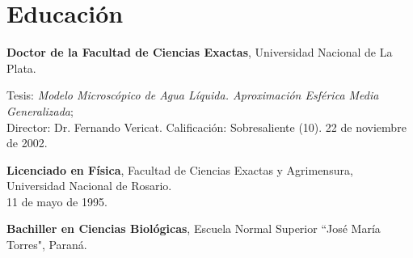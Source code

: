 \section*{Educación}

 \textbf{Doctor de la Facultad de Ciencias Exactas}, Universidad Nacional de La Plata.

Tesis: \emph{Modelo Microscópico de Agua Líquida. Aproximación Esférica Media Generalizada}; \\Director: Dr. Fernando Vericat. Calificación: Sobresaliente  (10). 22 de noviembre de 2002.

 \textbf{Licenciado en Física}, Facultad de Ciencias Exactas y Agrimensura, Universidad Nacional de Rosario. \\11 de mayo de 1995.

 \textbf{Bachiller en Ciencias Biológicas}, Escuela Normal Superior ``José María Torres", Paraná.
